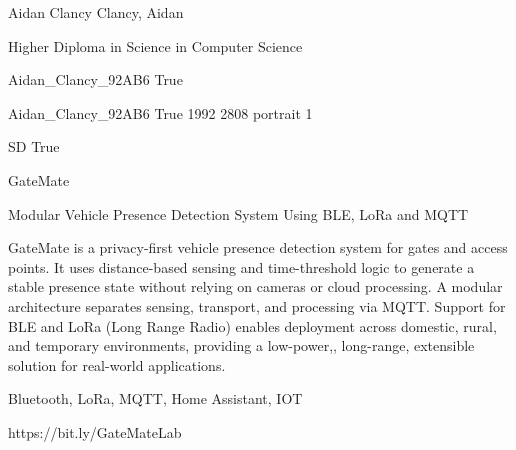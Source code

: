 \documentclass[twoside]{report}
\begin{document}
\begingroup{}\relax



\def\Key{Aidan_Clancy_92AB6}

{Aidan Clancy}
{Clancy, Aidan}

{Higher Diploma in Science in Computer Science}

{Aidan_Clancy_92AB6}
{True}

{Aidan_Clancy_92AB6}
{True}
{1992}
{2808}
{portrait}
{1}

{SD}
{True}

{GateMate}

{Modular Vehicle Presence Detection System Using BLE, LoRa and MQTT}

{GateMate is a privacy-first vehicle presence detection system for gates and access points. It uses distance-based sensing and time-threshold logic to generate a stable presence state without relying on cameras or cloud processing. A modular architecture separates sensing, transport, and processing via MQTT. Support for BLE and LoRa (Long Range Radio) enables deployment across domestic, rural, and temporary environments, providing a low-power,, long-range, extensible solution for real-world applications.}

{Bluetooth, LoRa, MQTT, Home Assistant, IOT}

{https://bit.ly/GateMateLab}
\end{document}
